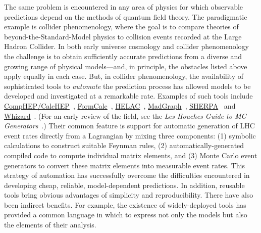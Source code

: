 \documentclass[11pt,a4paper]{article}
\newcommand{\packagefont}{\sffamily}
\newcommand{\MadGraph}{{\packagefont MadGraph}}
\newcommand{\FormCalc}{{\packagefont FormCalc}}
\newcommand{\CompHEP}{{\packagefont CompHEP}}
\newcommand{\CalcHEP}{{\packagefont CalcHEP}}
\newcommand{\HELAC}{{\packagefont HELAC}}
\newcommand{\SHERPA}{{\packagefont SHERPA}}
\newcommand{\Whizard}{{\packagefont Whizard}}
\begin{document}
The same problem
is encountered in any area of physics for which
observable predictions depend on the methods of quantum field theory.
The paradigmatic example is collider phenomenology,
where the goal is
to compare theories of beyond-the-Standard-Model physics
to collision events recorded at the Large Hadron Collider.
In both early universe cosmology and collider phenomenology the challenge is to
obtain sufficiently accurate predictions from a diverse and growing range
of physical models---and,
in principle, the obstacles listed above apply
equally in each case.
But, in collider phenomenology, the availability of sophisticated tools
to \emph{automate}
the prediction process has allowed models to be developed and investigated
at a remarkable rate.
Examples of such tools include
\href{http://theory.sinp.msu.ru/~pukhov/calchep.html}{{\CompHEP}/{\CalcHEP}}~\cite{Pukhov:1999gg,Boos:2004kh,Pukhov:2004ca,Belyaev:2012qa},
\href{http://www.feynarts.de/formcalc/}{\FormCalc}~\cite{Hahn:1998yk,Hahn:2000kx,Hahn:2006qw,Agrawal:2011tm},
\href{http://helac-phegas.web.cern.ch/helac-phegas/helac-phegas.html}{\HELAC}~\cite{Kanaki:2000ey,Cafarella:2007pc},
\href{http://madgraph.hep.uiuc.edu}{\MadGraph}~\cite{Maltoni:2002qb,Alwall:2007st,Alwall:2011uj,Alwall:2014hca},
\href{https://sherpa.hepforge.org/trac/wiki}{\SHERPA}~\cite{Gleisberg:2003xi,Gleisberg:2008ta} and
\href{https://whizard.hepforge.org}{\Whizard}~\cite{Moretti:2001zz,Kilian:2007gr}.
(For an early review of the field, see the
\emph{Les Houches Guide to MC Generators}~\cite{Dobbs:2004qw}.)
Their
common feature is support for automatic
generation of LHC event rates
directly from a Lagrangian
by mixing three components:
(1) symbolic calculations
to construct suitable Feynman rules,
(2) automatically-generated compiled code
to compute individual matrix elements,
and (3) Monte Carlo event generators to convert these matrix
elements into
measurable event rates.
This strategy of automation has successfully
overcome the difficulties encountered in
developing cheap, reliable,
model-dependent predictions.
In addition,
reusable tools
bring
obvious advantages of simplicity
and reproducibility.
There have also been indirect benefits.
For example, the existence of widely-deployed
tools has provided a common language
in which to express not only the models but also the
elements of their analysis.
\end{document}
